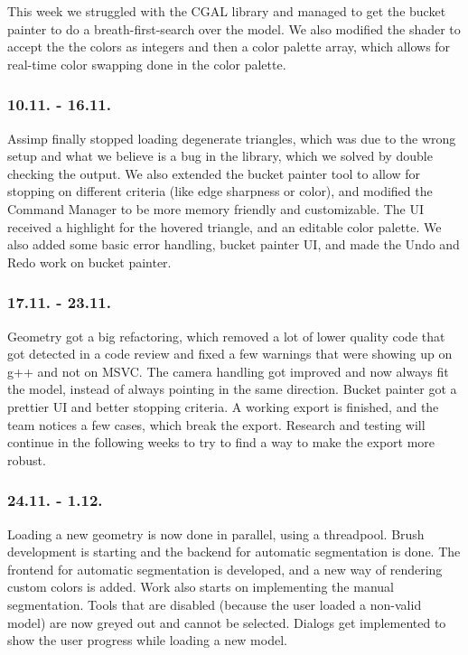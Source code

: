 This week we struggled with the CGAL library and managed to get the bucket painter to do a breath-first-search over the model. We also modified the shader to accept the the colors as integers and then a color palette array, which allows for real-time color swapping done in the color palette.

\subsubsection{10.11. - 16.11.}

Assimp finally stopped loading degenerate triangles, which was due to the wrong setup and what we believe is a bug in the library, which we solved by double checking the output. We also extended the bucket painter tool to allow for stopping on different criteria (like edge sharpness or color), and modified the Command Manager to be more memory friendly and customizable. The UI received a highlight for the hovered triangle, and an editable color palette. We also added some basic error handling, bucket painter UI, and made the Undo and Redo work on bucket painter.

\subsubsection{17.11. - 23.11.}

Geometry got a big refactoring, which removed a lot of lower quality code that got detected in a code review and fixed a few warnings that were showing up on g++ and not on MSVC. The camera handling got improved and now always fit the model, instead of always pointing in the same direction. Bucket painter got a prettier UI and better stopping criteria. A working export is finished, and the team notices a few cases, which break the export. Research and testing will continue in the following weeks to try to find a way to make the export more robust.

\subsubsection{24.11. - 1.12.}

Loading a new geometry is now done in parallel, using a threadpool. Brush development is starting and the backend for automatic segmentation is done. The frontend for automatic segmentation is developed, and a new way of rendering custom colors is added. Work also starts on implementing the manual segmentation. Tools that are disabled (because the user loaded a non-valid model) are now greyed out and cannot be selected. Dialogs get implemented to show the user progress while loading a new model.

